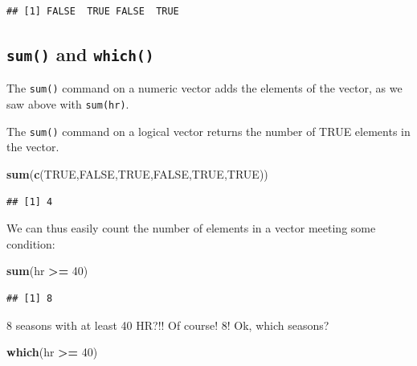 \documentclass[
]{book}
\newenvironment{Shaded}{\begin{snugshade}}{\end{snugshade}}
\newcommand{\ConstantTok}[1]{\textcolor[rgb]{0.56,0.35,0.01}{#1}}
\newcommand{\DecValTok}[1]{\textcolor[rgb]{0.00,0.00,0.81}{#1}}
\newcommand{\FunctionTok}[1]{\textcolor[rgb]{0.13,0.29,0.53}{\textbf{#1}}}
\newcommand{\NormalTok}[1]{#1}
\newcommand{\SpecialCharTok}[1]{\textcolor[rgb]{0.81,0.36,0.00}{\textbf{#1}}}
\theoremstyle{definition}
\theoremstyle{definition}
\theoremstyle{definition}
\theoremstyle{definition}
\theoremstyle{remark}
\begin{document}
\begin{verbatim}
## [1] FALSE  TRUE FALSE  TRUE
\end{verbatim}

\subsection*{\texorpdfstring{\texttt{sum()} and \texttt{which()}}{sum() and which()}}\label{sum-and-which}

The \texttt{sum()} command on a numeric vector adds the elements of the vector, as we saw above with \texttt{sum(hr)}.

The \texttt{sum()} command on a logical vector returns the number of TRUE elements in the vector.

\begin{Shaded}
\begin{Highlighting}[]
\FunctionTok{sum}\NormalTok{(}\FunctionTok{c}\NormalTok{(}\ConstantTok{TRUE}\NormalTok{,}\ConstantTok{FALSE}\NormalTok{,}\ConstantTok{TRUE}\NormalTok{,}\ConstantTok{FALSE}\NormalTok{,}\ConstantTok{TRUE}\NormalTok{,}\ConstantTok{TRUE}\NormalTok{))}
\end{Highlighting}
\end{Shaded}

\begin{verbatim}
## [1] 4
\end{verbatim}

We can thus easily count the number of elements in a vector meeting some condition:

\begin{Shaded}
\begin{Highlighting}[]
\FunctionTok{sum}\NormalTok{(hr }\SpecialCharTok{\textgreater{}=} \DecValTok{40}\NormalTok{)}
\end{Highlighting}
\end{Shaded}

\begin{verbatim}
## [1] 8
\end{verbatim}

8 seasons with at least 40 HR?!! Of course! 8! Ok, which seasons?

\begin{Shaded}
\begin{Highlighting}[]
\FunctionTok{which}\NormalTok{(hr }\SpecialCharTok{\textgreater{}=} \DecValTok{40}\NormalTok{)}
\end{Highlighting}
\end{Shaded}
\end{document}
